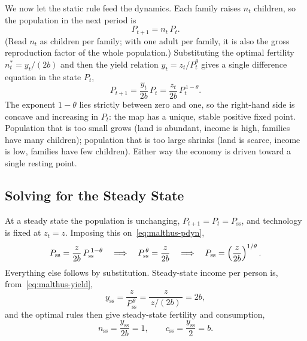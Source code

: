 We now let the static rule feed the dynamics. Each family raises $n_t$ children, so the population in the next period is
\begin{equation}
P_{t+1} = n_t\, P_t.
\label{eq:malthus-lom}
\end{equation}
(Read $n_t$ as children per family; with one adult per family, it is also the gross reproduction factor of the whole population.) Substituting the optimal fertility $n_t^{*} = y_t/(2b)$ and then the yield relation $y_t = z_t / P_t^{\theta}$ gives a single difference equation in the state $P_t$,
\begin{equation}
P_{t+1} = \frac{y_t}{2b}\, P_t = \frac{z_t}{2b}\, P_t^{\,1-\theta}.
\label{eq:malthus-pdyn}
\end{equation}
The exponent $1-\theta$ lies strictly between zero and one, so the right-hand side is concave and increasing in $P_t$: the map has a unique, stable positive fixed point. Population that is too small grows (land is abundant, income is high, families have many children); population that is too large shrinks (land is scarce, income is low, families have few children). Either way the economy is driven toward a single resting point.

\subsection{Solving for the Steady State}

At a steady state the population is unchanging, $P_{t+1} = P_t = P_{\mathrm{ss}}$, and technology is fixed at $z_t = z$. Imposing this on~\eqref{eq:malthus-pdyn},
\[
P_{\mathrm{ss}} = \frac{z}{2b}\, P_{\mathrm{ss}}^{\,1-\theta}
\quad\Longrightarrow\quad
P_{\mathrm{ss}}^{\,\theta} = \frac{z}{2b}
\quad\Longrightarrow\quad
P_{\mathrm{ss}} = \left(\frac{z}{2b}\right)^{1/\theta}.
\]
Everything else follows by substitution. Steady-state income per person is, from~\eqref{eq:malthus-yield},
\[
y_{\mathrm{ss}} = \frac{z}{P_{\mathrm{ss}}^{\,\theta}}
= \frac{z}{\,z/(2b)\,} = 2b,
\]
and the optimal rules then give steady-state fertility and consumption,
\[
n_{\mathrm{ss}} = \frac{y_{\mathrm{ss}}}{2b} = 1,
\qquad
c_{\mathrm{ss}} = \frac{y_{\mathrm{ss}}}{2} = b.
\]


